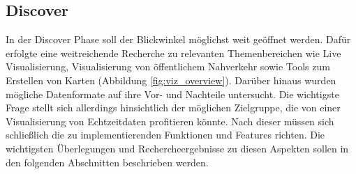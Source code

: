 \begin{newpage}
  \section{Discover}
  \label{sec:discover}
    In der Discover Phase soll der Blickwinkel möglichst weit geöffnet werden. 
    Dafür erfolgte eine weitreichende Recherche zu relevanten Themenbereichen wie Live Visualisierung, Visualisierung von öffentlichem Nahverkehr sowie Tools zum Erstellen von Karten (Abbildung \ref{fig:viz_overview}). Darüber hinaus wurden mögliche Datenformate auf ihre Vor- und Nachteile untersucht. Die wichtigste Frage stellt sich allerdings hinsichtlich der möglichen Zielgruppe, die von einer Visualisierung von Echtzeitdaten profitieren könnte. Nach dieser müssen sich schließlich die zu implementierenden Funktionen und Features richten. Die wichtigsten Überlegungen und Rechercheergebnisse zu diesen Aspekten sollen in den folgenden Abschnitten beschrieben werden. 

    
    
    
    
    
\end{newpage}